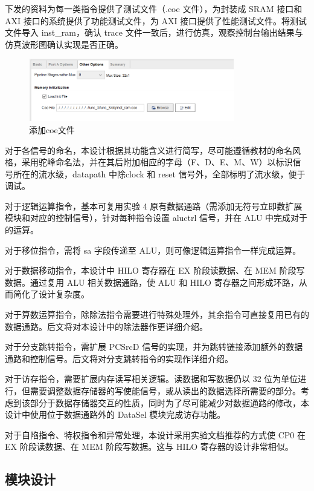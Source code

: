 下发的资料为每一类指令提供了测试文件（.coe 文件），为封装成 SRAM 接口和 AXI 接口的系统提供了功能测试文件，为 AXI 接口提供了性能测试文件。将测试文件导入 inst\_ram，确认 trace 文件一致后，进行仿真，观察控制台输出结果与仿真波形图确认实现是否正确。

\begin{figure}[htbp]
    \centering
    \includegraphics[width=0.8\textwidth]{image/coe.png}
    \caption{添加coe文件}
    \label{fig:my_label}
\end{figure}

对于各信号的命名，本设计根据其功能含义进行简写，尽可能遵循教材\cite{computer-organization-and-design}的命名风格，采用驼峰命名法，并在其后附加相应的字母（F、D、E、M、W）以标识信号所在的流水级，datapath 中除clock 和 reset 信号外，全部标明了流水级，便于调试。

对于逻辑运算指令，基本可复用实验 4 原有数据通路（需添加无符号立即数扩展模块和对应的控制信号），针对每种指令设置 aluctrl 信号，并在 ALU 中完成对于的运算。

对于移位指令，需将 sa 字段传递至 ALU，则可像逻辑运算指令一样完成运算。

对于数据移动指令，本设计中 HILO 寄存器在 EX 阶段读数据、在 MEM 阶段写数据。通过复用 ALU 相关数据通路，使 ALU 和 HILO 寄存器之间形成环路，从而简化了设计复杂度。

对于算数运算指令，除除法指令需要进行特殊处理外，其余指令可直接复用已有的数据通路。后文将对本设计中的除法器作更详细介绍。

对于分支跳转指令，需扩展 PCSrcD 信号的实现，并为跳转链接添加额外的数据通路和控制信号。后文将对分支跳转指令的实现作详细介绍。

对于访存指令，需要扩展内存读写相关逻辑。读数据和写数据仍以 32 位为单位进行，但需要调整数据存储器的写使能信号，或从读出的数据选择所需要的部分。考虑到该部分于数据存储器交互的性质，同时为了尽可能减少对数据通路的修改，本设计中使用位于数据通路外的 DataSel 模块完成访存功能。

对于自陷指令、特权指令和异常处理，本设计采用实验文档推荐的方式使 CP0 在 EX 阶段读数据、在 MEM 阶段写数据。这与 HILO 寄存器的设计非常相似。

\newpage
\subsection{模块设计}

